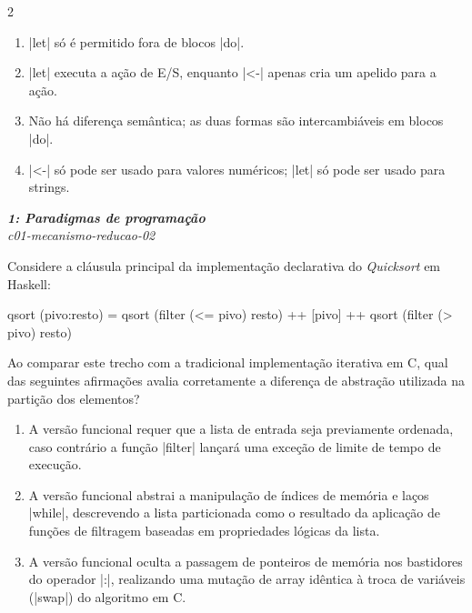 \documentclass[a4paper,10pt,brazil]{article}
\begin{document}
\begin{multicols}{2}
\begin{enumerate}
  \item \haskellinline|let| só é permitido fora de blocos \haskellinline|do|.

  \item \haskellinline|let| executa a ação de E/S, enquanto \haskellinline|<-| apenas cria um apelido para a ação.

  \item Não há diferença semântica; as duas formas são intercambiáveis em blocos \haskellinline|do|.

  \item \haskellinline|<-| só pode ser usado para valores numéricos; \haskellinline|let| só pode ser usado para strings.


\end{enumerate}

\begin{flushright}
  \footnotesize
  \textit{\textbf{1: Paradigmas de programação}}\\
  \textit{c01-mecanismo-reducao-02}\\

\end{flushright}
Considere a cláusula principal da implementação declarativa do \emph{Quicksort} em Haskell:

\begin{haskellcode}
qsort (pivo:resto) = qsort (filter (<= pivo) resto) ++ 
                     [pivo] ++ 
                     qsort (filter (> pivo) resto)
\end{haskellcode}

Ao comparar este trecho com a tradicional implementação iterativa em C, qual das seguintes afirmações avalia corretamente a diferença de abstração utilizada na partição dos elementos?

\begin{enumerate}
  \item A versão funcional requer que a lista de entrada seja previamente ordenada, caso contrário a função \haskellinline|filter| lançará uma exceção de limite de tempo de execução.

  \item A versão funcional abstrai a manipulação de índices de memória e laços \cinline|while|, descrevendo a lista particionada como o resultado da aplicação de funções de filtragem baseadas em propriedades lógicas da lista.

  \item A versão funcional oculta a passagem de ponteiros de memória nos bastidores do operador \haskellinline|:|, realizando uma mutação de array idêntica à troca de variáveis (\cinline|swap|) do algoritmo em C.


\end{enumerate}
\end{multicols}
\end{document}
